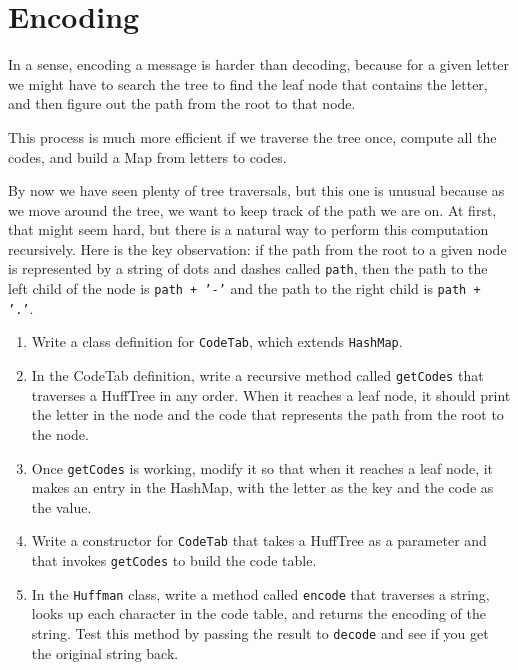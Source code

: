 \section{Encoding}
\label{codetab}

In a sense, encoding a message is harder than decoding, because for a
given letter we might have to search the tree to find the leaf node
that contains the letter, and then figure out the path from the root
to that node.

This process is much more efficient if we traverse the tree once,
compute all the codes, and build a Map from letters to
codes.

By now we have seen plenty of tree traversals, but this one is
unusual because as we move around the tree, we want to keep track
of the path we are on.  At first, that might seem hard, but there
is a natural way to perform this computation recursively.  Here
is the key observation: if the path from the root to a given node
is represented by a string of dots and dashes called {\tt path},
then the path to the left child of the node is {\tt path + '-'}
and the path to the right child is {\tt path + '.'}.

\begin{exercise}
\begin{enumerate}
\item Write a class definition for {\tt CodeTab}, which extends
{\tt HashMap}.

\item In the CodeTab definition,
write a recursive method called {\tt getCodes} that traverses
a HuffTree in any order.  When it reaches a leaf node, it should
print the letter in the node and the code that represents the path
from the root to the node.

\item Once {\tt getCodes} is working, modify it so that when it
reaches a leaf node, it makes an entry in the HashMap, with
the letter as the key and the code as the value.

\item Write a constructor for {\tt CodeTab} that takes a HuffTree as
a parameter and that invokes {\tt getCodes} to build the code
table.

\item In the {\tt Huffman} class, write a method called {\tt encode}
that traverses a string, looks up each character in the code
table, and returns the encoding of the string.  Test this method
by passing the result to {\tt decode} and see if you get the
original string back.

\end{enumerate}

\end{exercise}

